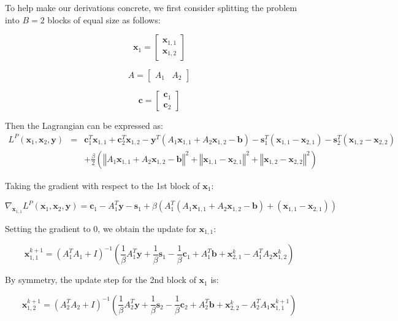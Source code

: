 \documentclass{article}
\begin{document}
To help make our derivations concrete, we first consider splitting the problem into $B=2$ blocks of equal size as follows:

\[
\mathbf{x}_{1}=\begin{bmatrix}\mathbf{x}_{1,1}\\
\mathbf{x}_{1,2}
\end{bmatrix}
\]


\[
A=\begin{bmatrix}A_{1} & A_{2}\end{bmatrix}
\]

\[
\mathbf{c}=\begin{bmatrix}\mathbf{c}_{1}\\
\mathbf{c}_{2}
\end{bmatrix}
\]


Then the Lagrangian can be expressed as:
\begin{eqnarray*}
L^{P}(\mathbf{x}_{1},\mathbf{x}_{2},\mathbf{y}) & = & \mathbf{c}_{1}^{T}\mathbf{x}_{1,1}+\mathbf{c}_{2}^{T}\mathbf{x}_{1,2}-\mathbf{y}^{T}\left(A_{1}\mathbf{x}_{1,1}+A_{2}\mathbf{x}_{1,2}-\mathbf{b}\right)-\mathbf{s}_{1}^{T}\left(\mathbf{x}_{1,1}-\mathbf{x}_{2,1}\right)-\mathbf{s}_{2}^{T}\left(\mathbf{x}_{1,2}-\mathbf{x}_{2,2}\right)\\
 &  & +\frac{\beta}{2}\left(\left\Vert A_{1}\mathbf{x}_{1,1}+A_{2}\mathbf{x}_{1,2}-\mathbf{b}\right\Vert ^{2}+\left\Vert \mathbf{x}_{1,1}-\mathbf{x}_{2,1}\right\Vert ^{2}+\left\Vert \mathbf{x}_{1,2}-\mathbf{x}_{2,2}\right\Vert ^{2}\right)
\end{eqnarray*}


Taking the gradient with respect to the 1st block of $\mathbf{x}_{1}$:

\[
\nabla_{\mathbf{x}_{1,1}}L^{P}(\mathbf{x}_{1},\mathbf{x}_{2},\mathbf{y})=\mathbf{c}_{1}-A_{1}^{T}\mathbf{y}-\mathbf{s}_{1}+\beta\left(A_{1}^{T}\left(A_{1}\mathbf{x}_{1,1}+A_{2}\mathbf{x}_{1,2}-\mathbf{b}\right)+\left(\mathbf{x}_{1,1}-\mathbf{x}_{2,1}\right)\right)
\]


Setting the gradient to 0, we obtain the update for $\mathbf{x}_{1,1}$:

\[
\mathbf{x}_{1,1}^{k+1}=\left(A_{1}^{T}A_{1}+I\right)^{-1}\left(\frac{1}{\beta}A_{1}^{T}\mathbf{y}+\frac{1}{\beta}\mathbf{s}_{1}-\frac{1}{\beta}\mathbf{c}_{1}+A_{1}^{T}\mathbf{b}+\mathbf{x}_{2,1}^{k}-A_{1}^{T}A_{2}\mathbf{x}_{1,2}^{k}\right)
\]


By symmetry, the update step for the 2nd block of $\mathbf{x}_{1}$
is:

\[
\mathbf{x}_{1,2}^{k+1}=\left(A_{2}^{T}A_{2}+I\right)^{-1}\left(\frac{1}{\beta}A_{2}^{T}\mathbf{y}+\frac{1}{\beta}\mathbf{s}_{2}-\frac{1}{\beta}\mathbf{c}_{2}+A_{2}^{T}\mathbf{b}+\mathbf{x}_{2,2}^{k}-A_{2}^{T}A_{1}\mathbf{x}_{1,1}^{k+1}\right)
\]
\end{document}
